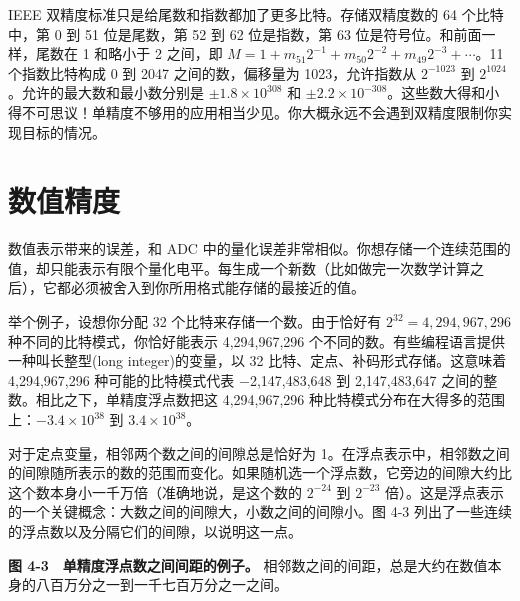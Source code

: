 IEEE 双精度标准只是给尾数和指数都加了更多比特。存储双精度数的 64
个比特中，第 0 到 51 位是尾数，第 52 到 62 位是指数，第 63
位是符号位。和前面一样，尾数在 1 和略小于 2 之间，即
\(M = 1 + m_{51}2^{-1} + m_{50}2^{-2} + m_{49}2^{-3} + \cdots\)。11
个指数比特构成 0 到 2047 之间的数，偏移量为 1023，允许指数从
\(2^{-1023}\) 到 \(2^{1024}\)。允许的最大数和最小数分别是
\(\pm 1.8 \times 10^{308}\) 和
\(\pm 2.2 \times 10^{-308}\)。这些数大得和小得不可思议！单精度不够用的应用相当少见。你大概永远不会遇到双精度限制你实现目标的情况。

\section{数值精度}

数值表示带来的误差，和 ADC
中的量化误差非常相似。你想存储一个连续范围的值，却只能表示有限个量化电平。每生成一个新数（比如做完一次数学计算之后），它都必须被舍入到你所用格式能存储的最接近的值。

举个例子，设想你分配 32 个比特来存储一个数。由于恰好有
\(2^{32} = 4,294,967,296\) 种不同的比特模式，你恰好能表示 4,294,967,296
个不同的数。有些编程语言提供一种叫长整型(long integer)的变量，以 32
比特、定点、补码形式存储。这意味着 4,294,967,296 种可能的比特模式代表
−2,147,483,648 到 2,147,483,647 之间的整数。相比之下，单精度浮点数把这
4,294,967,296 种比特模式分布在大得多的范围上：\(-3.4 \times 10^{38}\) 到
\(3.4 \times 10^{38}\)。

对于定点变量，相邻两个数之间的间隙总是恰好为
1。在浮点表示中，相邻数之间的间隙随所表示的数的范围而变化。如果随机选一个浮点数，它旁边的间隙大约比这个数本身小一千万倍（准确地说，是这个数的
\(2^{-24}\) 到 \(2^{-23}\)
倍）。这是浮点表示的一个关键概念：大数之间的间隙大，小数之间的间隙小。图
4-3 列出了一些连续的浮点数以及分隔它们的间隙，以说明这一点。

\textbf{图 4-3　单精度浮点数之间间距的例子。}
相邻数之间的间距，总是大约在数值本身的八百万分之一到一千七百万分之一之间。

